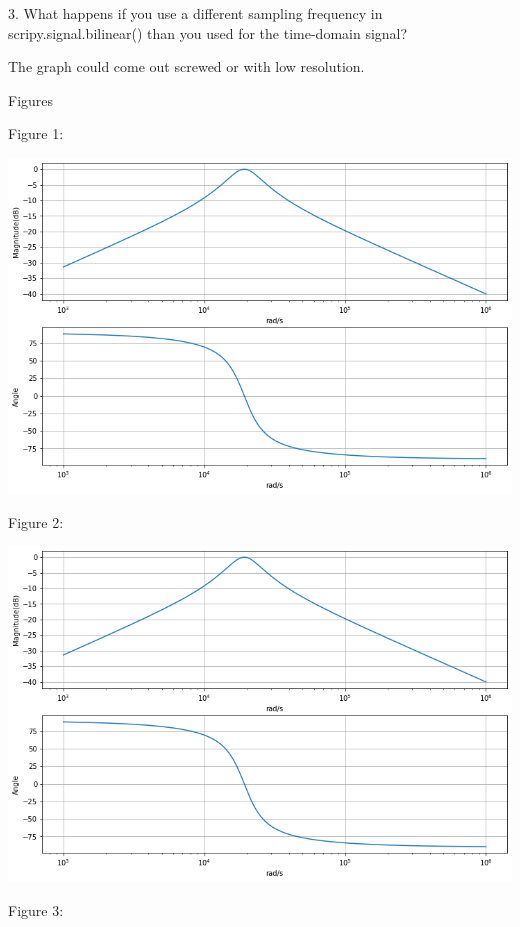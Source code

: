 \documentclass[nobib]{MSword}
\begin{document}
3. What happens if you use a different sampling frequency in scripy.signal.bilinear() than you used for the time-domain signal?

The graph could come out screwed or with low resolution.

\begin{center}
    Figures
\end{center}

Figure 1:

\includegraphics[scale = 0.6]
{txt/Lab10Fig1.png}

Figure 2:

\includegraphics[scale = 0.6]
{txt/Lab10Fig2.png}


Figure 3:
\end{document}
